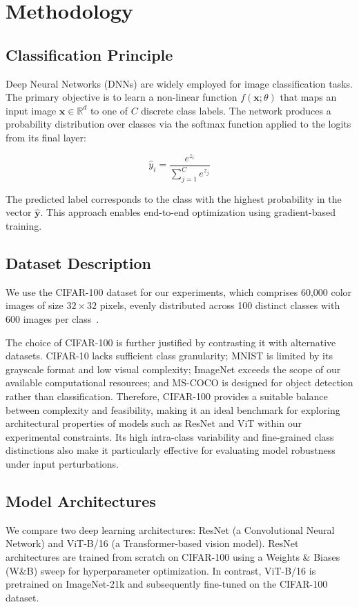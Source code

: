 \documentclass[conference]{IEEEtran}
\begin{document}
\section{Methodology}
\subsection{Classification Principle}
Deep Neural Networks (DNNs) are widely employed for image classification tasks. The primary objective is to learn a non-linear function \( f(\mathbf{x}; \theta) \) that maps an input image \( \mathbf{x} \in \mathbb{R}^d \) to one of \( C \) discrete class labels. The network produces a probability distribution over classes via the softmax function applied to the logits from its final layer:

\[
\hat{y}_i = \frac{e^{z_i}}{\sum_{j=1}^{C} e^{z_j}}
\]

The predicted label corresponds to the class with the highest probability in the vector \( \hat{\mathbf{y}} \). This approach enables end-to-end optimization using gradient-based training.

\subsection{Dataset Description}
We use the CIFAR-100 dataset for our experiments, which comprises 60{,}000 color images of size \(32 \times 32\) pixels, evenly distributed across 100 distinct classes with 600 images per class~\cite{krizhevsky2009learning}.

The choice of CIFAR-100 is further justified by contrasting it with alternative datasets. CIFAR-10 lacks sufficient class granularity; MNIST is limited by its grayscale format and low visual complexity; ImageNet exceeds the scope of our available computational resources; and MS-COCO is designed for object detection rather than classification. Therefore, CIFAR-100 provides a suitable balance between complexity and feasibility, making it an ideal benchmark for exploring architectural properties of models such as ResNet and ViT within our experimental constraints. Its high intra-class variability and fine-grained class distinctions also make it particularly effective for evaluating model robustness under input perturbations.
\subsection{Model Architectures}
We compare two deep learning architectures: ResNet (a Convolutional Neural Network) and ViT-B/16 (a Transformer-based vision model). ResNet architectures are trained from scratch on CIFAR-100 using a Weights \& Biases (W\&B) sweep for hyperparameter optimization. In contrast, ViT-B/16 is pretrained on ImageNet-21k and subsequently fine-tuned on the CIFAR-100 dataset.
\end{document}
